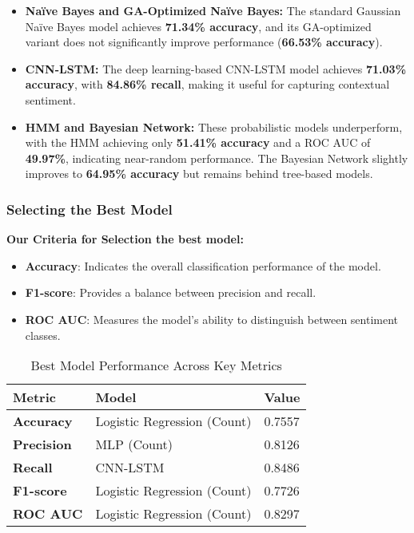 \begin{itemize}
    \item \textbf{Naïve Bayes and GA-Optimized Naïve Bayes:} The standard Gaussian Naïve Bayes model achieves \textbf{71.34\% accuracy}, and its GA-optimized variant does not significantly improve performance (\textbf{66.53\% accuracy}).

    \item \textbf{CNN-LSTM:} The deep learning-based CNN-LSTM model achieves \textbf{71.03\% accuracy}, with \textbf{84.86\% recall}, making it useful for capturing contextual sentiment.

    \item \textbf{HMM and Bayesian Network:} These probabilistic models underperform, with the HMM achieving only \textbf{51.41\% accuracy} and a ROC AUC of \textbf{49.97\%}, indicating near-random performance. The Bayesian Network slightly improves to \textbf{64.95\% accuracy} but remains behind tree-based models.

\end{itemize}

\subsubsection{Selecting the Best Model}

\textbf{Our Criteria for Selection the best model:} 

\begin{itemize}
    \item \textbf{Accuracy}: Indicates the overall classification performance of the model.
    \item \textbf{F1-score}: Provides a balance between precision and recall.
    \item \textbf{ROC AUC}: Measures the model’s ability to distinguish between sentiment classes.
\end{itemize}

\begin{table}[H]
\centering
\caption{Best Model Performance Across Key Metrics}
\label{tab:best_model}
\begin{tabular}{|l|l|l|}
\hline
\textbf{Metric} & \textbf{Model} & \textbf{Value} \\ \hline
\textbf{Accuracy} & Logistic Regression (Count) & 0.7557 \\ \hline
\textbf{Precision} & MLP (Count) & 0.8126 \\ \hline
\textbf{Recall} & CNN-LSTM & 0.8486 \\ \hline
\textbf{F1-score} & Logistic Regression (Count) & 0.7726 \\ \hline
\textbf{ROC AUC} & Logistic Regression (Count) & 0.8297 \\ \hline
\end{tabular}
\end{table}

